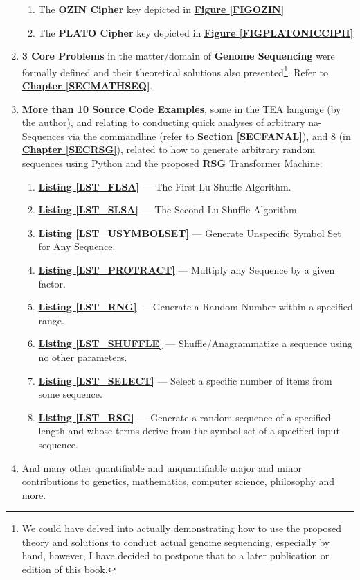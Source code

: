 \documentclass[a4paper, 18pt]{book} %
\begin{document}
\begin{enumerate}
{\begin{enumerate}
\item The \textbf{OZIN Cipher} key depicted in \textbf{\hyperref[FIGOZIN]{Figure \ref{FIGOZIN}}}
\item The \textbf{PLATO Cipher} key depicted in \textbf{\hyperref[FIGPLATONICCIPH]{Figure \ref{FIGPLATONICCIPH}}}
\end{enumerate}

}
\item \textbf{3 Core Problems} in the matter/domain of \textbf{Genome Sequencing} were formally defined and their theoretical solutions also presented\footnote{We could have delved into actually demonstrating how to use the proposed theory and solutions to conduct actual genome sequencing, especially by hand, however, I have decided to postpone that to a later publication or edition of this book.}. Refer to \textbf{\hyperref[SECMATHSEQ]{Chapter \ref{SECMATHSEQ}}}.

\item{ \textbf{More than 10 Source Code Examples}, some in the TEA language (by the author\cite{cli_tttt}), and relating to conducting quick analyses of arbitrary na-Sequences via the commandline (refer to \textbf{\hyperref[SECFANAL]{Section \ref{SECFANAL}}}), and 8 (in \textbf{\hyperref[SECRSG]{Chapter \ref{SECRSG}}}), related to how to generate arbitrary random sequences using Python and the proposed \textbf{RSG} Transformer Machine:

\begin{enumerate}
\item \textbf{\hyperref[LST_FLSA]{Listing \ref{LST_FLSA}}} --- The First Lu-Shuffle Algorithm.
\item \textbf{\hyperref[LST_SLSA]{Listing \ref{LST_SLSA}}} --- The Second  Lu-Shuffle Algorithm.
\item \textbf{\hyperref[LST_USYMBOLSET]{Listing \ref{LST_USYMBOLSET}}} --- Generate Unspecific Symbol Set for Any Sequence.
\item \textbf{\hyperref[LST_PROTRACT]{Listing \ref{LST_PROTRACT}}} --- Multiply any Sequence by a given factor.
\item \textbf{\hyperref[LST_RNG]{Listing \ref{LST_RNG}}} --- Generate a Random Number within a specified range.
\item \textbf{\hyperref[LST_SHUFFLE]{Listing \ref{LST_SHUFFLE}}} --- Shuffle/Anagrammatize a sequence using no other parameters.
\item \textbf{\hyperref[LST_SELECT]{Listing \ref{LST_SELECT}}} --- Select a specific number of items from some sequence.
\item \textbf{\hyperref[LST_RSG]{Listing \ref{LST_RSG}}} --- Generate a random sequence of a specified length and whose terms derive from the symbol set of a specified input sequence.
\end{enumerate}

}
\item And many other quantifiable and unquantifiable major and minor contributions to genetics, mathematics, computer science, philosophy and more.
\end{enumerate}
\end{document}
